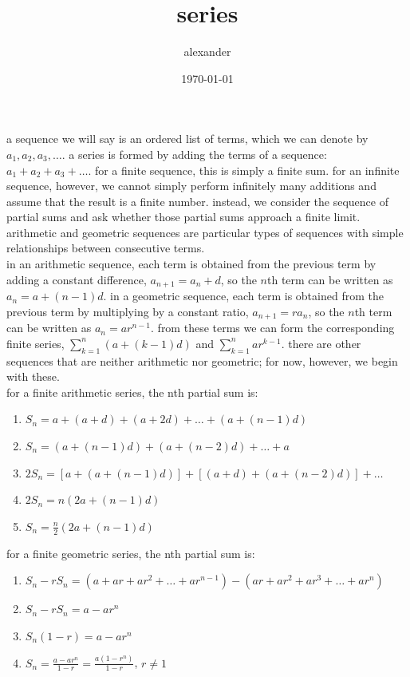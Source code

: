 \documentclass{article}
\title{series}
\author{alexander}
\date{\today}
\begin{document}
\maketitle



a sequence we will say is an ordered list of terms, which we can denote by $a_1,a_2,a_3,\ldots$. a series is formed by adding the terms of a sequence: $a_1+a_2+a_3+\ldots$. for a finite sequence, this is simply a finite sum. for an infinite sequence, however, we cannot simply perform infinitely many additions and assume that the result is a finite number. instead, we consider the sequence of partial sums and ask whether those partial sums approach a finite limit. arithmetic and geometric sequences are particular types of sequences with simple relationships between consecutive terms.\\

in an arithmetic sequence, each term is obtained from the previous term by adding a constant difference, $a_{n+1}=a_n+d$, so the $n$th term can be written as $a_n=a+(n-1)d$. in a geometric sequence, each term is obtained from the previous term by multiplying by a constant ratio, $a_{n+1}=ra_n$, so the $n$th term can be written as $a_n=ar^{n-1}$. from these terms we can form the corresponding finite series, $\sum_{k=1}^{n}(a+(k-1)d)$ and $\sum_{k=1}^{n}ar^{k-1}$. there are other sequences that are neither arithmetic nor geometric; for now, however, we begin with these.\\

for a finite arithmetic series, the nth partial sum is:
\begin{enumerate}
	\item $S_n = a + (a + d) + (a + 2d) + \ldots + (a + (n - 1)d)$
	\item $S_n = (a + (n - 1)d) + (a + (n - 2)d) + \ldots + a$
	\item $2S_n = [a + (a + (n - 1)d)] + [(a + d) + (a + (n - 2)d)] + \ldots$
	\item $2S_n = n(2a + (n - 1)d)$
	\item $S_n = \frac{n}{2}(2a + (n - 1)d)$
\end{enumerate}

\newpage
for a finite geometric series, the nth partial sum is:
\begin{enumerate}
	\item $S_n - rS_n = (a + ar + ar^2 + \ldots + ar^{n-1}) - (ar + ar^2 + ar^3 + \ldots + ar^n)$
	\item $S_n - rS_n = a - ar^n$
	\item $S_n(1-r) = a-ar^n$
	\item $S_n = \frac{a-ar^n}{1-r} = \frac{a(1-r^n)}{1-r}$, $r\neq1$
\end{enumerate}
\end{document}
